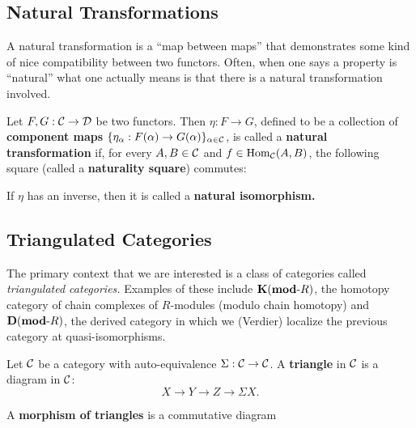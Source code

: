 \documentclass[12pt]{article}
\begin{document}
\subsection{Natural Transformations}
A natural transformation is a ``map between maps'' that demonstrates some kind of nice compatibility between two functors.
Often, when one says a property is ``natural'' what one actually means is that there is a natural transformation involved.

\begin{defn}
	Let $F,G:\mathcal{C}\to\mathcal{D}$ be two functors. Then $\eta:F\to G$, defined to be a collection of \textbf{component maps} $\{\eta_\alpha:F(\alpha)\to G(\alpha)\}_{\alpha\in\mathcal{C}}$, 
	is called a \textbf{natural transformation} if, for every 
	$A,B\in\mathcal{C}$ and $f\in\operatorname{Hom}_{\mathcal{C}}(A,B)$, the following square (called a \textbf{naturality square}) commutes:
	\begin{center}
	\end{center}
	If $\eta$ has an inverse, then it is called a \textbf{natural isomorphism.}
\end{defn}

\subsection{Triangulated Categories}
The primary context that we are interested is a class of categories called \textit{triangulated categories.} Examples of 
these include $\mathbf{K}(\mathbf{mod}\text{-}R)$, the homotopy category of chain complexes of $R$-modules (modulo chain homotopy) and $\mathbf{D}(\mathbf{mod}\text{-}R)$,
the derived category in which we (Verdier) localize the previous category at quasi-isomorphisms.
\begin{defn}
	Let $\mathcal{C}$ be a category with auto-equivalence $\Sigma:\mathcal{C}\to\mathcal{C}$. A \textbf{triangle} in $\mathcal{C}$ is a diagram in $\mathcal{C}$:
	\[X\to Y\to Z\to\Sigma X.\]
\end{defn}
\begin{defn}
	A \textbf{morphism of triangles} is a commutative diagram
	\begin{center}
	\end{center}
\end{defn}
\end{document}
